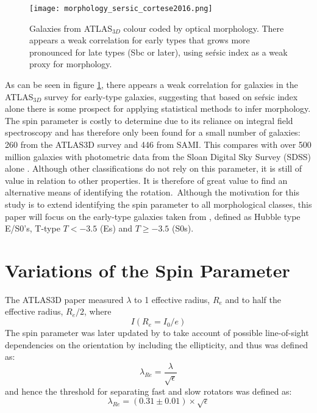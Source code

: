 \begin{figure}[h]
	\centering
	\texttt{[image: morphology\_sersic\_cortese2016.png]}
	\caption{Galaxies from ATLAS$_{3D}$ colour coded by optical morphology. There appears a weak correlation for early types that grows more pronounced for late types (Sbc or later), using se\'rsic index as a weak proxy for morphology.	
		\cite{Cortese2016}}
	\label{fig:morphologysersic}
\end{figure}
As can be seen in figure \ref{fig:morphologysersic}, there appears a weak correlation for galaxies in the ATLAS$_{3D}$ survey for early-type galaxies, suggesting that based on se\'rsic index alone there is some prospect for applying statistical methods to infer morphology.
The spin parameter is costly to determine due to its reliance on integral field spectroscopy and has therefore only been found for a small number of galaxies: 260 from the ATLAS3D survey and 446 from SAMI. This compares with over 500 million galaxies with photometric data from the Sloan Digital Sky Survey (SDSS) alone \cite{SDSS}. Although other classifications do not rely on this parameter, it is still of value in relation to other properties. It is therefore of great value to find an alternative means of identifying the rotation.\
Although the motivation for this study is to extend identifying the spin parameter to all morphological classes, this paper will focus on the early-type galaxies taken from \cite{Emsellem2011}, defined as Hubble type E/S0's, T-type $T < −3.5$ (Es) and $T \geq −3.5$ (S0s).
\section{Variations of the Spin Parameter}
The ATLAS3D paper measured $\lambda$ to 1 effective radius, $R_{e}$ and to half the effective radius, $R_{e}/2$, where 
\begin{equation}
I(R_{e}=I_{0}/e)
\end{equation}
The spin parameter was later updated by \cite{Cappellari2011} to take account of possible line-of-sight dependencies on the orientation by including the ellipticity, and thus was defined as:
\begin{equation}
\lambda_{Re} = \frac{\lambda}{\sqrt{\epsilon}}
\end{equation}
and hence the threshold for separating fast and slow rotators was defined as:
\begin{equation}
\lambda_{Re}=(0.31\pm0.01)\times \sqrt{\epsilon}
\end{equation}
